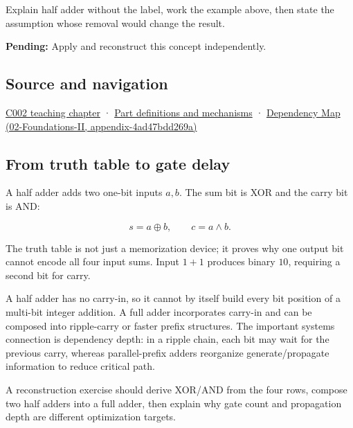 Explain half adder without the label, work the example above, then state the assumption whose removal would change the result.

\textbf{Pending:} Apply and reconstruct this concept independently.

\subsection{Source and navigation}\label{source-and-navigation}

\href{Continuous\%20Notes/Computing\%20Foundations\%20-\%20From\%20Bits\%20to\%20C++\%20and\%20Systems\%20APIs\#Arithmetic\%20becomes\%20a\%20policy}{C002 teaching chapter} · \hyperref[appendix-fd090d982a15]{Part definitions and mechanisms} · \href{}{Dependency Map (02-Foundations-II, appendix-4ad47bdd269a)}

\subsection{From truth table to gate delay}\label{from-truth-table-to-gate-delay}

A half adder adds two one-bit inputs \(a,b\). The sum bit is XOR and the carry bit is AND:

\[
s=a\oplus b,\qquad c=a\land b.
\]

The truth table is not just a memorization device; it proves why one output bit cannot encode all four input sums. Input \(1+1\) produces binary \(10\), requiring a second bit for carry.

A half adder has no carry-in, so it cannot by itself build every bit position of a multi-bit integer addition. A full adder incorporates carry-in and can be composed into ripple-carry or faster prefix structures. The important systems connection is dependency depth: in a ripple chain, each bit may wait for the previous carry, whereas parallel-prefix adders reorganize generate/propagate information to reduce critical path.

A reconstruction exercise should derive XOR/AND from the four rows, compose two half adders into a full adder, then explain why gate count and propagation depth are different optimization targets.
